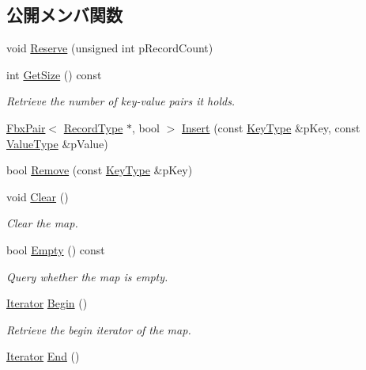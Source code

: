 \subsection*{公開メンバ関数}
\begin{DoxyCompactItemize}
\item 
void \hyperlink{class_fbx_map_ad9fcc220fda44cdd23ad848d1dcd5725}{Reserve} (unsigned int p\+Record\+Count)
\item 
int \hyperlink{class_fbx_map_a0dcb49b244b4de4a27b4157a5915d2ae}{Get\+Size} () const
\begin{DoxyCompactList}\small\item\em Retrieve the number of key-\/value pairs it holds. \end{DoxyCompactList}\item 
\hyperlink{class_fbx_pair}{Fbx\+Pair}$<$ \hyperlink{class_fbx_map_af8fc887461b3bf29f41aa36d15ddb54f}{Record\+Type} $\ast$, bool $>$ \hyperlink{class_fbx_map_a520c1d971dfe2401aa3d9824a0344ce4}{Insert} (const \hyperlink{class_fbx_map_ad8392c83b6f8eeb9e0706bcc8674270a}{Key\+Type} \&p\+Key, const \hyperlink{class_fbx_map_abea530b1192b31c3cf05fbf247e3dcaa}{Value\+Type} \&p\+Value)
\item 
bool \hyperlink{class_fbx_map_ae4d2e72014223a8292472394d80e4909}{Remove} (const \hyperlink{class_fbx_map_ad8392c83b6f8eeb9e0706bcc8674270a}{Key\+Type} \&p\+Key)
\item 
void \hyperlink{class_fbx_map_a4d7bc86f85835f091d6623d6e358d2ca}{Clear} ()
\begin{DoxyCompactList}\small\item\em Clear the map. \end{DoxyCompactList}\item 
bool \hyperlink{class_fbx_map_a64fb934f6378b6d41b383bdcfa3b5b26}{Empty} () const
\begin{DoxyCompactList}\small\item\em Query whether the map is empty. \end{DoxyCompactList}\item 
\hyperlink{class_fbx_map_ab0989f3b30c0c8652ff9ee1b28b5c1af}{Iterator} \hyperlink{class_fbx_map_ae4c5e09fb73bde49ef7f53ab0ad11fbd}{Begin} ()
\begin{DoxyCompactList}\small\item\em Retrieve the begin iterator of the map. \end{DoxyCompactList}\item 
\hyperlink{class_fbx_map_ab0989f3b30c0c8652ff9ee1b28b5c1af}{Iterator} \hyperlink{class_fbx_map_aaaef5f105428c380732482c46ad4b826}{End} ()

\end{DoxyCompactItemize}
